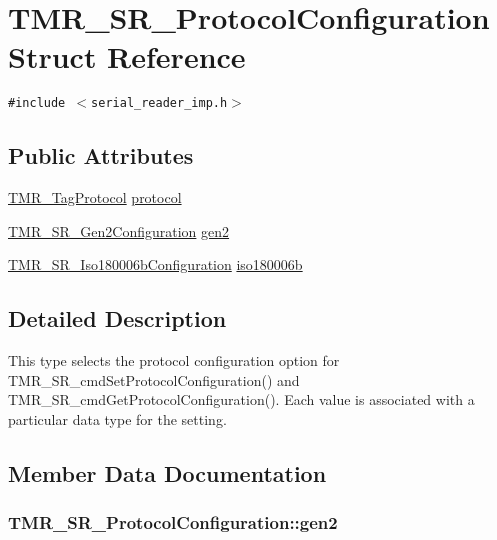 \hypertarget{struct_t_m_r___s_r___protocol_configuration}{
\section{TMR\_\-SR\_\-ProtocolConfiguration Struct Reference}
\label{struct_t_m_r___s_r___protocol_configuration}
}
{\tt \#include $<$serial\_\-reader\_\-imp.h$>$}

\subsection*{Public Attributes}
\begin{CompactItemize}
\item 
\hyperlink{tmr__tag__protocol_8h_1e727f69e94ccc81da4d3b9440aba934}{TMR\_\-TagProtocol} \hyperlink{struct_t_m_r___s_r___protocol_configuration_b36b11fe65197b5724e25cb7d46db9ba}{protocol}
\item 
\hyperlink{serial__reader__imp_8h_db5d58298b4280700fd23923c53eea36}{TMR\_\-SR\_\-Gen2Configuration} \hyperlink{struct_t_m_r___s_r___protocol_configuration_ddd1aad9626442ec0667f511ff427034}{gen2}
\item 
\hyperlink{serial__reader__imp_8h_6c766b49e7073131081a562bcfe96cf2}{TMR\_\-SR\_\-Iso180006bConfiguration} \hyperlink{struct_t_m_r___s_r___protocol_configuration_5324779e352fa7191b5a924183af0854}{iso180006b}
\end{CompactItemize}


\subsection{Detailed Description}
This type selects the protocol configuration option for TMR\_\-SR\_\-cmdSetProtocolConfiguration() and TMR\_\-SR\_\-cmdGetProtocolConfiguration(). Each value is associated with a particular data type for the setting. 

\subsection{Member Data Documentation}
\hypertarget{struct_t_m_r___s_r___protocol_configuration_ddd1aad9626442ec0667f511ff427034}{
\subsubsection[{gen2}]{ {\bf TMR\_\-SR\_\-ProtocolConfiguration::gen2}}}
\label{struct_t_m_r___s_r___protocol_configuration_ddd1aad9626442ec0667f511ff427034}


